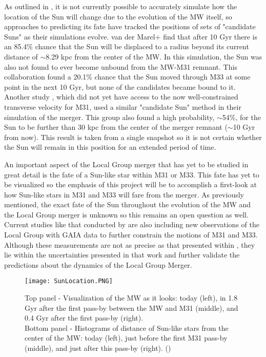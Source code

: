 \documentclass{aastex63}
\begin{document}
As outlined in \cite{2012ApJ...753....9V}, it is not currently possible to accurately simulate how the location of the Sun will change due to the evolution of the MW itself, so approaches to predicting its fate have tracked the positions of sets of "candidate Suns" as their simulations evolve. van der Marel+ find that after 10 Gyr there is an 85.4\% chance that the Sun will be displaced to a radius beyond its current distance of $\sim$8.29 kpc from the center of the MW. In this simulation, the Sun was also not found to ever become unbound from the MW-M31 remnant. This collaboration found a 20.1\% chance that the Sun moved through M33 at some point in the next 10 Gyr, but none of the candidates became bound to it. Another study \citep{2008MNRAS.386..461C}, which did not yet have access to the now well-constrained transverse velocity for M31, used a similar "candidate Sun" method in their simulation of the merger. This group also found a high probability, $\sim$54\%, for the Sun to be further than 30 kpc from the center of the merger remnant ($\sim$10 Gyr from now). This result is taken from a single snapshot so it is not certain whether the Sun will remain in this position for an extended period of time.

An important aspect of the Local Group merger that has yet to be studied in great detail is the fate of a Sun-like star within M31 or M33. This fate has yet to be visualized so the emphasis of this project will be to accomplish a first-look at how Sun-like stars in M31 and M33 will fare from the merger. As previously mentioned, the exact fate of the Sun throughout the evolution of the MW and the Local Group merger is unknown so this remains an open question as well. Current studies like that conducted by \cite{2019ApJ...872...24V} are also including new observations of the Local Group with GAIA data to further constrain the motions of M31 and M33. Although these measurements are not as precise as that presented within \citep{2012ApJ...753....9V}, they lie within the uncertainties presented in that work and further validate the predictions about the dynamics of the Local Group Merger. 

\begin{figure}
    \centering
    \texttt{[image: SunLocation.PNG]}
    \caption{Top panel - Visualization of the MW as it looks: today (left), in 1.8 Gyr after the first pass-by between the MW and M31 (middle), and 0.4 Gyr after the first pass-by (right).\\ Bottom panel - Histograms of distance of Sun-like stars from the center of the MW: today (left), just before the first M31 pass-by (middle), and just after this pass-by (right). (\cite{2008MNRAS.386..461C})}
    \label{fig:sunlocation}
\end{figure}
\end{document}
